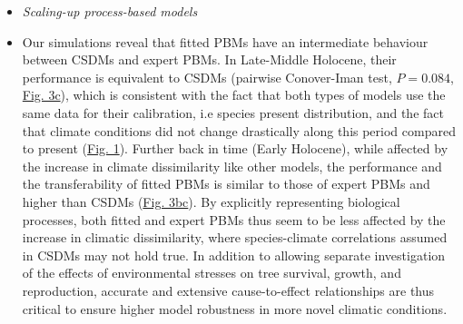 \documentclass[pdflatex, sn-nature]{sn-jnl}%
\begin{document}
\begin{itemize}
\item \emph{Scaling-up process-based models}\par
\item Our simulations reveal that fitted PBMs have an intermediate behaviour between CSDMs and expert PBMs. In Late-Middle Holocene, their performance is equivalent to CSDMs (pairwise Conover-Iman test, $P=0.084$, \hyperref[past_performance]{Fig. 3c}), which is consistent with the fact that both types of models use the same data for their calibration, i.e species present distribution, and the fact that climate conditions did not change drastically along this period compared to present (\hyperref[climatic_dissimilarity]{Fig. 1}). Further back in time (Early Holocene), while affected by the increase in climate dissimilarity like other models, the performance and the transferability of fitted PBMs is similar to those of expert PBMs and higher than CSDMs (\hyperref[past_performance]{Fig. 3bc}). By explicitly representing biological processes, both fitted and expert PBMs thus seem to be less affected by the increase in climatic dissimilarity, where species-climate correlations assumed in CSDMs may not hold true.  In addition to allowing separate investigation of the effects of environmental stresses on tree survival, growth, and reproduction, accurate and extensive cause-to-effect relationships are thus critical to ensure higher model robustness in more novel climatic conditions. 

\end{itemize}
\end{document}
